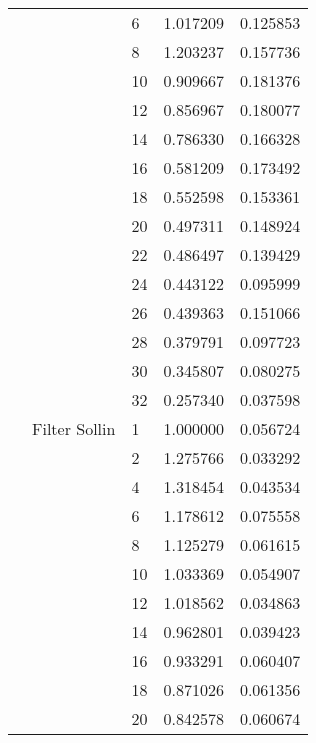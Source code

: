 \begin{tabular}{lllrr}
                      &            & 6  &  1.017209 &  0.125853 \\
                      &            & 8  &  1.203237 &  0.157736 \\
                      &            & 10 &  0.909667 &  0.181376 \\
                      &            & 12 &  0.856967 &  0.180077 \\
                      &            & 14 &  0.786330 &  0.166328 \\
                      &            & 16 &  0.581209 &  0.173492 \\
                      &            & 18 &  0.552598 &  0.153361 \\
                      &            & 20 &  0.497311 &  0.148924 \\
                      &            & 22 &  0.486497 &  0.139429 \\
                      &            & 24 &  0.443122 &  0.095999 \\
                      &            & 26 &  0.439363 &  0.151066 \\
                      &            & 28 &  0.379791 &  0.097723 \\
                      &            & 30 &  0.345807 &  0.080275 \\
                      &            & 32 &  0.257340 &  0.037598 \\
                      & Filter Sollin & 1  &  1.000000 &  0.056724 \\
                      &            & 2  &  1.275766 &  0.033292 \\
                      &            & 4  &  1.318454 &  0.043534 \\
                      &            & 6  &  1.178612 &  0.075558 \\
                      &            & 8  &  1.125279 &  0.061615 \\
                      &            & 10 &  1.033369 &  0.054907 \\
                      &            & 12 &  1.018562 &  0.034863 \\
                      &            & 14 &  0.962801 &  0.039423 \\
                      &            & 16 &  0.933291 &  0.060407 \\
                      &            & 18 &  0.871026 &  0.061356 \\
                      &            & 20 &  0.842578 &  0.060674 \\

\end{tabular}
